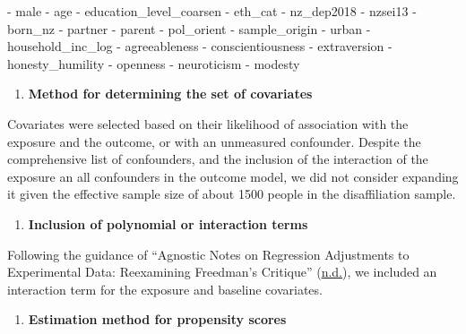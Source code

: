 \documentclass[
  singlecolumn]{report}
\newenvironment{Shaded}{\begin{snugshade}}{\end{snugshade}}
\newcommand{\NormalTok}[1]{\textcolor[rgb]{0.00,0.23,0.31}{#1}}
\newcommand{\SpecialStringTok}[1]{\textcolor[rgb]{0.13,0.47,0.30}{#1}}
\providecommand{\tightlist}{%
  \setlength{\itemsep}{0pt}\setlength{\parskip}{0pt}}\usepackage{longtable,booktabs,array}
\begin{document}
\begin{Shaded}
\begin{Highlighting}[]
\SpecialStringTok{{-} }\NormalTok{male}
\SpecialStringTok{{-} }\NormalTok{age}
\SpecialStringTok{{-} }\NormalTok{education\_level\_coarsen}
\SpecialStringTok{{-} }\NormalTok{eth\_cat}
\SpecialStringTok{{-} }\NormalTok{nz\_dep2018}
\SpecialStringTok{{-} }\NormalTok{nzsei13}
\SpecialStringTok{{-} }\NormalTok{born\_nz}
\SpecialStringTok{{-} }\NormalTok{partner}
\SpecialStringTok{{-} }\NormalTok{parent}
\SpecialStringTok{{-} }\NormalTok{pol\_orient}
\SpecialStringTok{{-} }\NormalTok{sample\_origin}
\SpecialStringTok{{-} }\NormalTok{urban}
\SpecialStringTok{{-} }\NormalTok{household\_inc\_log}
\SpecialStringTok{{-} }\NormalTok{agreeableness}
\SpecialStringTok{{-} }\NormalTok{conscientiousness}
\SpecialStringTok{{-} }\NormalTok{extraversion}
\SpecialStringTok{{-} }\NormalTok{honesty\_humility}
\SpecialStringTok{{-} }\NormalTok{openness}
\SpecialStringTok{{-} }\NormalTok{neuroticism}
\SpecialStringTok{{-} }\NormalTok{modesty}
\end{Highlighting}
\end{Shaded}

\begin{enumerate}
\def\labelenumi{\arabic{enumi}.}
\setcounter{enumi}{2}
\tightlist
\item
  \textbf{Method for determining the set of covariates}
\end{enumerate}

Covariates were selected based on their likelihood of association with
the exposure and the outcome, or with an unmeasured confounder. Despite
the comprehensive list of confounders, and the inclusion of the
interaction of the exposure an all confounders in the outcome model, we
did not consider expanding it given the effective sample size of about
1500 people in the disaffiliation sample.

\begin{enumerate}
\def\labelenumi{\arabic{enumi}.}
\setcounter{enumi}{3}
\tightlist
\item
  \textbf{Inclusion of polynomial or interaction terms}
\end{enumerate}

Following the guidance of {``Agnostic Notes on Regression Adjustments to
Experimental Data: Reexamining Freedman{'}s Critique''}
(\protect\hyperlink{ref-agnostic}{n.d.}), we included an interaction
term for the exposure and baseline covariates.

\begin{enumerate}
\def\labelenumi{\arabic{enumi}.}
\setcounter{enumi}{4}
\tightlist
\item
  \textbf{Estimation method for propensity scores}
\end{enumerate}
\end{document}
